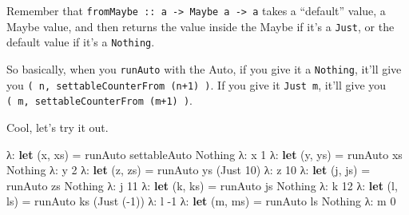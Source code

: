 \documentclass[]{article}
\newenvironment{Shaded}{}{}
\newcommand{\KeywordTok}[1]{\textcolor[rgb]{0.00,0.44,0.13}{\textbf{{#1}}}}
\newcommand{\DataTypeTok}[1]{\textcolor[rgb]{0.56,0.13,0.00}{{#1}}}
\newcommand{\DecValTok}[1]{\textcolor[rgb]{0.25,0.63,0.44}{{#1}}}
\newcommand{\OtherTok}[1]{\textcolor[rgb]{0.00,0.44,0.13}{{#1}}}
\newcommand{\FunctionTok}[1]{\textcolor[rgb]{0.02,0.16,0.49}{{#1}}}
\newcommand{\NormalTok}[1]{{#1}}
\begin{document}
\begin{Shaded}
\end{Shaded}

Remember that
\texttt{fromMaybe\ ::\ a\ -\textgreater{}\ Maybe\ a\ -\textgreater{}\ a}
takes a ``default'' value, a Maybe value, and then returns the value
inside the Maybe if it's a \texttt{Just}, or the default value if it's a
\texttt{Nothing}.

So basically, when you \texttt{runAuto} with the Auto, if you give it a
\texttt{Nothing}, it'll give you
\texttt{(\ n,\ settableCounterFrom\ (n+1)\ )}. If you give it
\texttt{Just\ m}, it'll give you
\texttt{(\ m,\ settableCounterFrom\ (m+1)\ )}.

Cool, let's try it out.

\begin{Shaded}
\begin{Highlighting}[]
\NormalTok{λ}\FunctionTok{:} \KeywordTok{let} \NormalTok{(x, xs) }\FunctionTok{=} \NormalTok{runAuto settableAuto }\DataTypeTok{Nothing}
\NormalTok{λ}\FunctionTok{:} \NormalTok{x}
\DecValTok{1}
\NormalTok{λ}\FunctionTok{:} \KeywordTok{let} \NormalTok{(y, ys) }\FunctionTok{=} \NormalTok{runAuto xs }\DataTypeTok{Nothing}
\NormalTok{λ}\FunctionTok{:} \NormalTok{y}
\DecValTok{2}
\NormalTok{λ}\FunctionTok{:} \KeywordTok{let} \NormalTok{(z, zs) }\FunctionTok{=} \NormalTok{runAuto ys (}\DataTypeTok{Just} \DecValTok{10}\NormalTok{)}
\NormalTok{λ}\FunctionTok{:} \NormalTok{z}
\DecValTok{10}
\NormalTok{λ}\FunctionTok{:} \KeywordTok{let} \NormalTok{(j, js) }\FunctionTok{=} \NormalTok{runAuto zs }\DataTypeTok{Nothing}
\NormalTok{λ}\FunctionTok{:} \NormalTok{j}
\DecValTok{11}
\NormalTok{λ}\FunctionTok{:} \KeywordTok{let} \NormalTok{(k, ks) }\FunctionTok{=} \NormalTok{runAuto js }\DataTypeTok{Nothing}
\NormalTok{λ}\FunctionTok{:} \NormalTok{k}
\DecValTok{12}
\NormalTok{λ}\FunctionTok{:} \KeywordTok{let} \NormalTok{(l, ls) }\FunctionTok{=} \NormalTok{runAuto ks (}\DataTypeTok{Just} \NormalTok{(}\FunctionTok{-}\DecValTok{1}\NormalTok{))}
\NormalTok{λ}\FunctionTok{:} \NormalTok{l}
\FunctionTok{-}\DecValTok{1}
\NormalTok{λ}\FunctionTok{:} \KeywordTok{let} \NormalTok{(m, ms) }\FunctionTok{=} \NormalTok{runAuto ls }\DataTypeTok{Nothing}
\NormalTok{λ}\FunctionTok{:} \NormalTok{m}
\DecValTok{0}
\end{Highlighting}
\end{Shaded}
\end{document}
